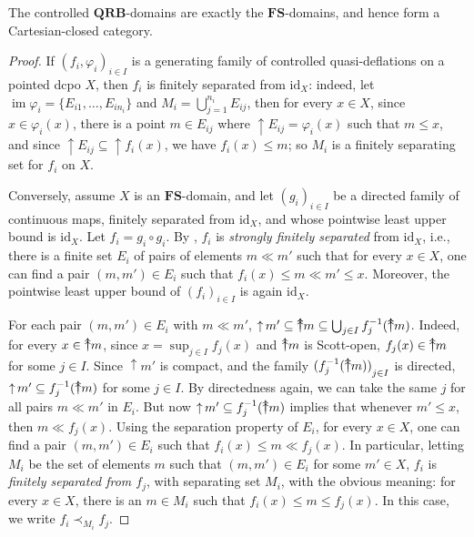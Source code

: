 \documentclass{LMCS}
\newcommand\img{\mathop{\mathrm{im}}}
\newcommand\upc{\mathop{\uparrow}\nolimits}
\newcommand\uuarrow{\rlap{$\uparrow$}\raise.5ex\hbox{$\uparrow$}}\newcommand\ddarrow{\rlap{$\downarrow$}\raise.5ex\hbox{$\downarrow$}}\newcommand\Fin{\mathop{\text{Fin}}}
\newcommand\QRB{\mathbf{QRB}}
\newcommand\FS{\mathbf{FS}}
\newcommand{\identity}[1]{\mathrm{id}_{#1}}
\begin{document}
\begin{thm}
  \label{thm:ctrlQRB}
  The controlled $\QRB$-domains are exactly the $\FS$-domains, and
  hence form a Cartesian-closed category.
\end{thm}
\begin{proof}
  If ${(f_i, \varphi_i)}_{i \in I}$ is a generating family of
  controlled quasi-deflations on a pointed dcpo $X$, then $f_i$ is
  finitely separated from $\identity X$: indeed, let $\img \varphi_i =
  \{E_{i1}, \ldots, E_{in_i}\}$ and $M_i = \bigcup_{j=1}^{n_i}
  E_{ij}$, then for every $x \in X$, since $x \in \varphi_i (x)$,
  there is a point $m \in E_{ij}$ where $\upc E_{ij} = \varphi_i (x)$
  such that $m \leq x$, and since $\upc E_{ij} \subseteq \upc f_i
  (x)$, we have $f_i (x) \leq m$; so $M_i$ is a finitely separating
  set for $f_i$ on $X$.

  Conversely, assume $X$ is an $\FS$-domain, and let ${(g_i)}_{i \in
    I}$ be a directed family of continuous maps, finitely separated
  from $\identity X$, and whose pointwise least upper bound is
  $\identity X$.  Let $f_i = g_i \circ g_i$.  By
  \cite[Lemma~2]{Jung:CCC:LICS}, $f_i$ is {\em strongly finitely
    separated\/} from $\identity X$, i.e., there is a finite set $E_i$
  of pairs of elements $m \ll m'$ such that for every $x \in X$, one
  can find a pair $(m, m') \in E_i$ such that $f_i (x) \leq m \ll m'
  \leq x$.  Moreover, the pointwise least upper bound of ${(f_i)}_{i
    \in I}$ is again $\identity X$.

  For each pair $(m, m') \in E_i$ with $m \ll m'$, $\upc m' \subseteq
  \uuarrow m \subseteq \bigcup_{j \in I} f_j^{-1} (\uuarrow m)$.
  Indeed, for every $x \in \uuarrow m$, since $x = \sup_{j \in I} f_j
  (x)$ and $\uuarrow m$ is Scott-open, $f_j (x) \in \uuarrow m$ for
  some $j \in I$.  Since $\upc m'$ is compact, and the family
  ${(f_j^{-1} (\uuarrow m))}_{j \in I}$ is directed, $\upc m'
  \subseteq f_j^{-1} (\uuarrow m)$ for some $j \in I$.  By
  directedness again, we can take the same $j$ for all pairs $m \ll
  m'$ in $E_i$.  But now $\upc m' \subseteq f_j^{-1} (\uuarrow m)$
  implies that whenever $m' \leq x$, then $m \ll f_j (x)$.  Using the
  separation property of $E_i$, for every $x \in X$, one can find a
  pair $(m, m') \in E_i$ such that $f_i (x) \leq m \ll f_j (x)$.  In
  particular, letting $M_i$ be the set of elements $m$ such that $(m,
  m') \in E_i$ for some $m' \in X$, $f_i$ is {\em finitely separated
    from $f_j$\/}, with separating set $M_i$, with the obvious
  meaning: for every $x \in X$, there is an $m \in M_i$ such that $f_i
  (x) \leq m \leq f_j (x)$.  In this case, we write $f_i \prec_{M_i}
  f_j$.


\end{proof}
\end{document}
